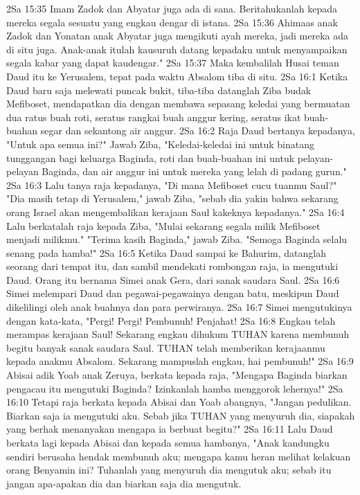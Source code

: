 2Sa 15:35  Imam Zadok dan Abyatar juga ada di sana. Beritahukanlah kepada mereka segala sesuatu yang engkau dengar di istana.
2Sa 15:36  Ahimaas anak Zadok dan Yonatan anak Abyatar juga mengikuti ayah mereka, jadi mereka ada di situ juga. Anak-anak itulah kausuruh datang kepadaku untuk menyampaikan segala kabar yang dapat kaudengar."
2Sa 15:37  Maka kembalilah Husai teman Daud itu ke Yerusalem, tepat pada waktu Absalom tiba di situ.
2Sa 16:1  Ketika Daud baru saja melewati puncak bukit, tiba-tiba datanglah Ziba budak Mefiboset, mendapatkan dia dengan membawa sepasang keledai yang bermuatan dua ratus buah roti, seratus rangkai buah anggur kering, seratus ikat buah-buahan segar dan sekantong air anggur.
2Sa 16:2  Raja Daud bertanya kepadanya, "Untuk apa semua ini?" Jawab Ziba, "Keledai-keledai ini untuk binatang tunggangan bagi keluarga Baginda, roti dan buah-buahan ini untuk pelayan-pelayan Baginda, dan air anggur ini untuk mereka yang lelah di padang gurun."
2Sa 16:3  Lalu tanya raja kepadanya, "Di mana Mefiboset cucu tuanmu Saul?" "Dia masih tetap di Yerusalem," jawab Ziba, "sebab dia yakin bahwa sekarang orang Israel akan mengembalikan kerajaan Saul kakeknya kepadanya."
2Sa 16:4  Lalu berkatalah raja kepada Ziba, "Mulai sekarang segala milik Mefiboset menjadi milikmu." "Terima kasih Baginda," jawab Ziba. "Semoga Baginda selalu senang pada hamba!"
2Sa 16:5  Ketika Daud sampai ke Bahurim, datanglah seorang dari tempat itu, dan sambil mendekati rombongan raja, ia mengutuki Daud. Orang itu bernama Simei anak Gera, dari sanak saudara Saul.
2Sa 16:6  Simei melempari Daud dan pegawai-pegawainya dengan batu, meskipun Daud dikelilingi oleh anak buahnya dan para perwiranya.
2Sa 16:7  Simei mengutukinya dengan kata-kata, "Pergi! Pergi! Pembunuh! Penjahat!
2Sa 16:8  Engkau telah merampas kerajaan Saul! Sekarang engkau dihukum TUHAN karena membunuh begitu banyak sanak saudara Saul. TUHAN telah memberikan kerajaanmu kepada anakmu Absalom. Sekarang mampuslah engkau, hai pembunuh!"
2Sa 16:9  Abisai adik Yoab anak Zeruya, berkata kepada raja, "Mengapa Baginda biarkan pengacau itu mengutuki Baginda? Izinkanlah hamba menggorok lehernya!"
2Sa 16:10  Tetapi raja berkata kepada Abisai dan Yoab abangnya, "Jangan pedulikan. Biarkan saja ia mengutuki aku. Sebab jika TUHAN yang menyuruh dia, siapakah yang berhak menanyakan mengapa ia berbuat begitu?"
2Sa 16:11  Lalu Daud berkata lagi kepada Abisai dan kepada semua hambanya, "Anak kandungku sendiri berusaha hendak membunuh aku; mengapa kamu heran melihat kelakuan orang Benyamin ini? Tuhanlah yang menyuruh dia mengutuk aku; sebab itu jangan apa-apakan dia dan biarkan saja dia mengutuk.
